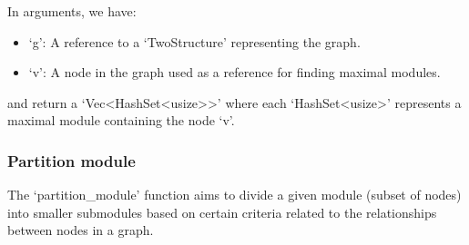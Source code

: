 In arguments, we have:
\begin{itemize}
    \item `g': A reference to a `TwoStructure' representing the graph.
    \item `v': A node in the graph used as a reference for finding maximal modules.
\end{itemize}

and return a `Vec\textless HashSet\textless usize\textgreater\textgreater' where each `HashSet\textless usize\textgreater' represents a maximal module containing the node `v'.

\subsubsection{Partition module}

The `partition\_module' function aims to divide a given module (subset of nodes) into smaller submodules based on certain criteria related to the relationships between nodes in a graph.

